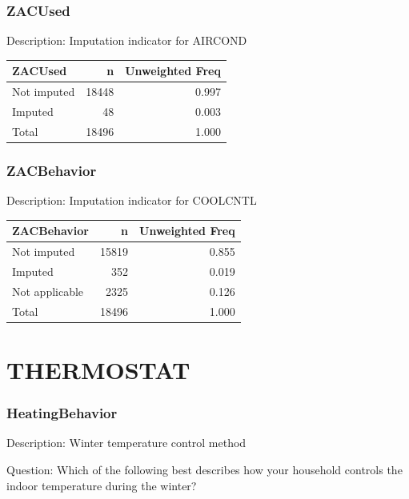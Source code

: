 \documentclass[
]{krantz}
\begin{document}
\hypertarget{zacused}{%
\subsubsection*{ZACUsed}\label{zacused}}


Description: Imputation indicator for AIRCOND

\begin{tabular}[t]{l|r|r}
\hline
ZACUsed & n & Unweighted Freq\\
\hline
Not imputed & 18448 & 0.997\\
\hline
Imputed & 48 & 0.003\\
\hline
Total & 18496 & 1.000\\
\hline
\end{tabular}

\hypertarget{zacbehavior}{%
\subsubsection*{ZACBehavior}\label{zacbehavior}}


Description: Imputation indicator for COOLCNTL

\begin{tabular}[t]{l|r|r}
\hline
ZACBehavior & n & Unweighted Freq\\
\hline
Not imputed & 15819 & 0.855\\
\hline
Imputed & 352 & 0.019\\
\hline
Not applicable & 2325 & 0.126\\
\hline
Total & 18496 & 1.000\\
\hline
\end{tabular}

\hypertarget{thermostat}{%
\section{THERMOSTAT}\label{thermostat}}

\hypertarget{heatingbehavior}{%
\subsubsection*{HeatingBehavior}\label{heatingbehavior}}


Description: Winter temperature control method

Question: Which of the following best describes how your household controls the indoor temperature during the winter?
\end{document}
